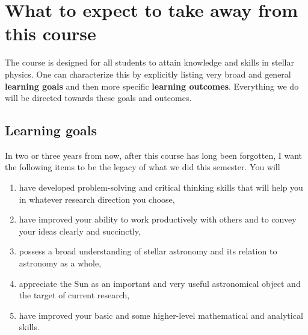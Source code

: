\documentclass[10pt,letterpaper]{article}
\begin{document}
\section{What to expect to take away from this course}

The course is designed for all students to attain knowledge and skills in stellar physics. One can characterize this by explicitly listing very broad and general {\bf learning goals} and then more specific {\bf learning outcomes}. Everything we do will be directed towards these goals and outcomes.

\subsection*{Learning goals}

In two or three years from now, after this course  has long been forgotten, I want the following items to be the legacy of what we did this semester. You will
\begin{enumerate}


\item have developed problem-solving and critical thinking skills that will help you in whatever research direction you choose,

\item have improved your ability to work productively with others and to convey your ideas clearly and succinctly,


\item possess a broad understanding of stellar astronomy and its relation to  astronomy as a whole,

\item appreciate the Sun as an important and very useful astronomical object and the target of  current research,


\item have improved your basic and some higher-level mathematical and analytical skills.


\end{enumerate}
\end{document}
